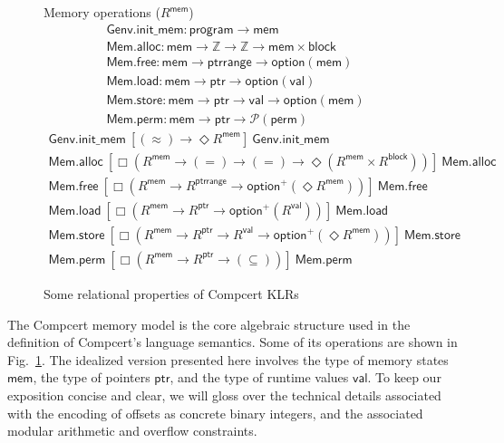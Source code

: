 \documentclass[sigplan,10pt,review,anonymous]{acmart}
\newcommand{\kw}[1]{\ensuremath{ \textsf{#1} }}
\newcommand{\ifr}[1]{\ [{#1}]\ }
\begin{document}
\begin{figure}
  \vspace{2em}
  Memory operations ($R^\kw{mem}$)
  \vspace{1em}
  \[
    \begin{array}{c}
      \kw{Genv.init\_mem} :
        \kw{program} \rightarrow \kw{mem}
      \\
      \kw{Mem.alloc} :
        \kw{mem} \rightarrow \mathbb{Z} \rightarrow \mathbb{Z} \rightarrow
        \kw{mem} \times \kw{block}
      \\
      \kw{Mem.free} :
        \kw{mem} \rightarrow
        \kw{ptrrange} \rightarrow
        \kw{option}(\kw{mem})
      \\
      \kw{Mem.load} :
        \kw{mem} \rightarrow \kw{ptr} \rightarrow \kw{option}(\kw{val})
      \\
      \kw{Mem.store} :
        \kw{mem} \rightarrow \kw{ptr} \rightarrow \kw{val} \rightarrow \kw{option}(\kw{mem})
      \\
      \kw{Mem.perm} :
        \kw{mem} \rightarrow \kw{ptr} \rightarrow \mathcal{P}(\kw{perm})
    \end{array}
  \]
  \vspace{0.5em}
  \[
    \begin{array}{c}
      \kw{Genv.init\_mem}
      \ifr{(\approx) \rightarrow \Diamond R^\kw{mem}}
      \kw{Genv.init\_mem}
      \\
      \kw{Mem.alloc}
      \ifr{\Box(R^\kw{mem} \rightarrow (=) \rightarrow (=) \rightarrow
        \Diamond (R^\kw{mem} \times R^\kw{block}))}
      \kw{Mem.alloc}
      \\
      \kw{Mem.free}
      \ifr{\Box(R^\kw{mem} \rightarrow R^\kw{ptrrange} \rightarrow
        \kw{option}^+(\Diamond R^\kw{mem}))}
      \kw{Mem.free}
      \\
      \kw{Mem.load}
      \ifr{\Box(R^\kw{mem} \rightarrow R^\kw{ptr} \rightarrow
        \kw{option}^+(R^\kw{val}))}
      \kw{Mem.load}
      \\
      \kw{Mem.store}
      \ifr{\Box(R^\kw{mem} \rightarrow R^\kw{ptr} \rightarrow R^\kw{val} \rightarrow
        \kw{option}^+(\Diamond R^\kw{mem}))}
      \kw{Mem.store}
      \\
      \kw{Mem.perm}
      \ifr{\Box(R^\kw{mem} \rightarrow R^\kw{ptr} \rightarrow (\subseteq))}
      \kw{Mem.perm}
    \end{array}
  \]
  \caption{Some relational properties of Compcert KLRs}
  \label{fig:cklr}
\end{figure}

The Compcert memory model \citep{compcertmmv2}
is the core algebraic structure
used in the definition of Compcert's language semantics.
Some of its operations
are shown in Fig.~\ref{fig:cklr}.
The idealized version presented here
involves
the type of memory states \kw{mem},
the type of pointers \kw{ptr}, and
the type of runtime values \kw{val}.
To keep our exposition concise and clear,
we will gloss over the technical details
associated with the encoding of offsets
as concrete binary integers,
and the associated modular arithmetic and overflow constraints.
\end{document}
